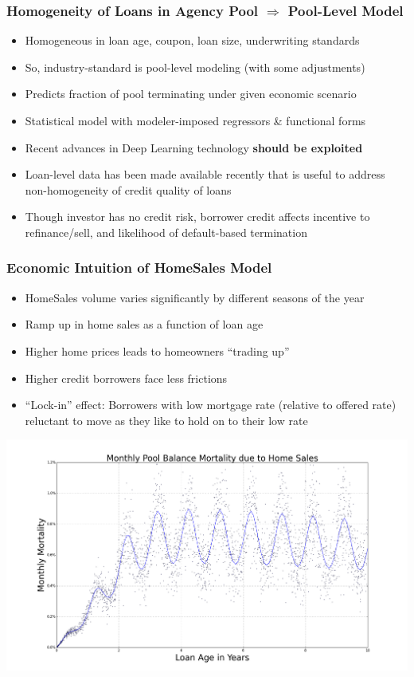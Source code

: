 \documentclass{beamer}
\begin{document}
\begin{frame}
\frametitle{Homogeneity of Loans in Agency Pool $\Rightarrow$ Pool-Level Model}
\begin{itemize}
\item Homogeneous in loan age, coupon, loan size, underwriting standards
\item So, industry-standard is pool-level modeling (with some adjustments)
\item Predicts fraction of pool terminating under given economic scenario
\item Statistical model with modeler-imposed regressors \& functional forms
\item Recent advances in Deep Learning technology {\bf should be exploited}
\item Loan-level data has been made available recently that is useful to address non-homogeneity of credit quality of loans
\item Though investor has no credit risk, borrower credit affects incentive to refinance/sell, and likelihood of default-based termination
\end{itemize}
\end{frame}

\begin{frame}
\frametitle{Economic Intuition of HomeSales Model}
\begin{itemize}
\item HomeSales volume varies significantly by different seasons of the year
\item Ramp up in home sales as a function of loan age
\item Higher home prices leads to homeowners ``trading up''
\item Higher credit borrowers face less frictions
\item ``Lock-in'' effect: Borrowers with low mortgage rate (relative to offered rate) reluctant to move as they like to hold on to their low rate
\end{itemize}
\end{frame}

\begin{frame}
\includegraphics[scale=0.26]{relo_by_age.png}
\end{frame}
\end{document}
